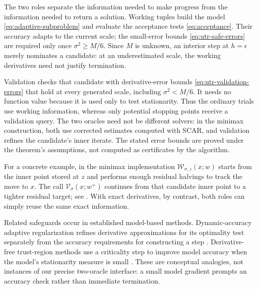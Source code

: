 \documentclass{article}
\begin{document}
\begin{remark}
\label{rem:utr-oracle-roles}
The two roles separate the information needed to make progress from
the information needed to return a solution.  Working tuples build the
model \eqref{eq:adaptive-subproblem} and evaluate the acceptance tests
\eqref{eq:acceptance}.  Their accuracy adapts to the current scale;
the small-error bounds \eqref{eq:utr-safe-errors} are required only
once $\sigma^2\ge M/6$.  Since $M$ is unknown, an interior step at
$h=\epsilon$ merely nominates a candidate: at an underestimated
scale, the working derivatives need not justify termination.

Validation checks that candidate with derivative-error bounds
\eqref{eq:utr-validation-errors} that hold at every generated scale,
including $\sigma^2<M/6$.  It needs no function value because it is
used only to test stationarity.  Thus the ordinary trials use working
information, whereas only potential stopping points receive a
validation query.  The two oracles need not be different solvers:
in the minimax construction, both use corrected estimates computed
with SCAR, and validation refines the candidate's inner iterate.
The stated error bounds are proved under the theorem's assumptions,
not computed as certificates by the algorithm.

For a concrete example, in the minimax implementation
$\mathcal W_{\sigma,z}(x;w)$ starts from the inner point stored at
$z$ and performs enough residual halvings to track the move to $x$.
The call $\mathcal V_\sigma(x;w^+)$ continues from that candidate
inner point to a tighter residual target; see
.  With exact derivatives, by contrast,
both roles can simply reuse the same exact information.

Related safeguards occur in established model-based methods.
Dynamic-accuracy adaptive regularization refines derivative
approximations for its optimality test separately from the accuracy
requirements for constructing a step
\citep[Algorithms~3.1--3.3]{bellavia2019adaptive}.
Derivative-free trust-region methods use a criticality step to
improve model accuracy when the model's stationarity measure is
small \citep[Algorithms~4.1--4.2 and~6.1--6.2]{conn2009global}.
These are conceptual analogies, not instances of our precise
two-oracle interface: a small model gradient prompts an accuracy
check rather than immediate termination.
\end{remark}
\end{document}
